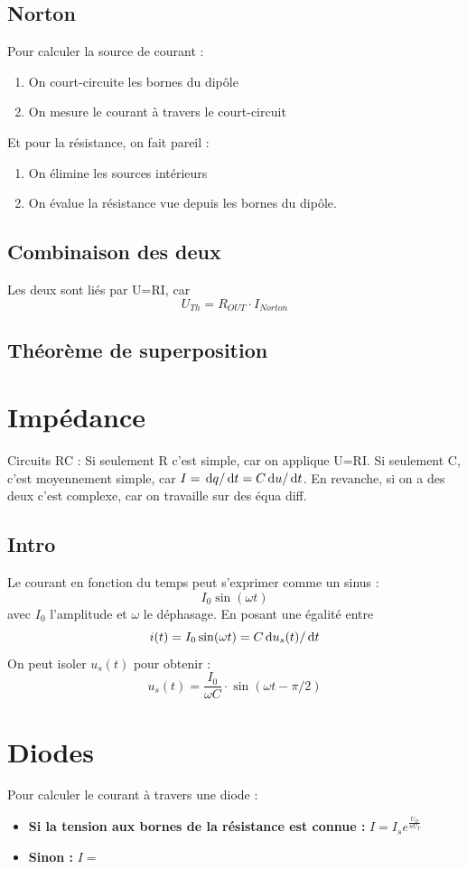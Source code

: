 \documentclass[12pt,a4paper]{article}
\begin{document}
\subsection{Norton}
Pour calculer la source de courant :
\begin{enumerate}
	\item 	On court-circuite les bornes du dipôle
	\item 	On mesure le courant à travers le court-circuit
\end{enumerate}
Et pour la résistance, on fait pareil :
\begin{enumerate}
	\item 	On élimine les sources intérieurs
	\item 	On évalue la résistance vue depuis les bornes du dipôle.
\end{enumerate}

\subsection{Combinaison des deux}
Les deux sont liés par U=RI, car 
\[U_{Th} = R_{OUT}\cdot I_{Norton}\]

\subsection{Théorème de superposition}

\section{Impédance}
Circuits RC : Si seulement R c'est simple, car on applique U=RI. Si seulement C, c'est moyennement simple, car $I = \, \mathrm d q/\, \mathrm d t = C\, \mathrm d u/\, \mathrm d t$. En revanche, si on a des deux c'est complexe, car on travaille sur des équa diff.\\
\subsection{Intro}
Le courant en fonction du temps peut s'exprimer comme un sinus : \[I_0 \sin(\omega t)\]
avec $I_0$ l'amplitude et $\omega$ le déphasage. En posant une égalité entre 
\[i(t) = I_0 \sin(\omega t) = C\, \mathrm d u_s(t)/\, \mathrm d t\]
On peut isoler $u_s(t)$ pour obtenir : \[u_s(t) = \frac{I_0}{\omega C}\cdot \sin(\omega t - \pi/2)\]

\section{Diodes}
Pour calculer le courant à travers une diode :
\begin{itemize}
	\item \textbf{Si la tension aux bornes de la résistance est connue :} $I = I_se^{\frac{U_D}{nU_T}}$
	\item \textbf{Sinon :} $I = $
\end{itemize}
\end{document}
